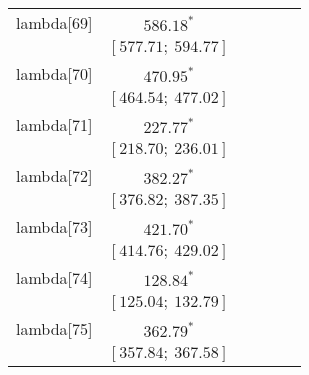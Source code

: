 \begin{table}
\begin{center}
\begin{tabular}{l c c c c c }
lambda[69]  & $586.18^{*}$                     &                           &                           &                         &                         \\
            & $[577.71;\ 594.77]$              &                           &                           &                         &                         \\
lambda[70]  & $470.95^{*}$                     &                           &                           &                         &                         \\
            & $[464.54;\ 477.02]$              &                           &                           &                         &                         \\
lambda[71]  & $227.77^{*}$                     &                           &                           &                         &                         \\
            & $[218.70;\ 236.01]$              &                           &                           &                         &                         \\
lambda[72]  & $382.27^{*}$                     &                           &                           &                         &                         \\
            & $[376.82;\ 387.35]$              &                           &                           &                         &                         \\
lambda[73]  & $421.70^{*}$                     &                           &                           &                         &                         \\
            & $[414.76;\ 429.02]$              &                           &                           &                         &                         \\
lambda[74]  & $128.84^{*}$                     &                           &                           &                         &                         \\
            & $[125.04;\ 132.79]$              &                           &                           &                         &                         \\
lambda[75]  & $362.79^{*}$                     &                           &                           &                         &                         \\
            & $[357.84;\ 367.58]$              &                           &                           &                         &                         \\

\end{tabular}
\end{center}
\end{table}
